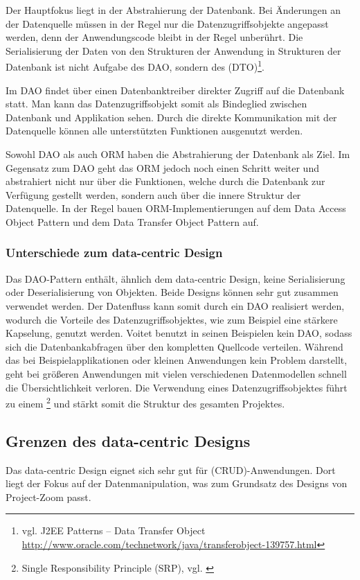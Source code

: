 Der Hauptfokus liegt in der Abstrahierung der Datenbank. Bei Änderungen an der Datenquelle müssen in der Regel nur die Datenzugriffsobjekte angepasst werden, denn der Anwendungscode bleibt in der Regel unberührt. Die Serialisierung der Daten von den Strukturen der Anwendung in Strukturen der Datenbank ist nicht Aufgabe des DAO, sondern des  (DTO)\footnote{vgl. J2EE Patterns – Data Transfer Object \url{http://www.oracle.com/technetwork/java/transferobject-139757.html}}.

Im DAO findet über einen Datenbanktreiber direkter Zugriff auf die Datenbank statt. Man kann das Datenzugriffsobjekt somit als Bindeglied zwischen Datenbank und Applikation sehen. Durch die direkte Kommunikation mit der Datenquelle können alle unterstützten Funktionen ausgenutzt werden. 

Sowohl DAO als auch ORM haben die Abstrahierung der Datenbank als Ziel. Im Gegensatz zum DAO geht das ORM jedoch noch einen Schritt weiter und abstrahiert nicht nur über die Funktionen, welche durch die Datenbank zur Verfügung gestellt werden, sondern auch über die innere Struktur der Datenquelle. In der Regel bauen ORM-Implementierungen auf dem Data Access Object Pattern und dem Data Transfer Object Pattern auf.

\subsubsection{Unterschiede zum data-centric Design}
Das DAO-Pattern enthält, ähnlich dem data-centric Design, keine Serialisierung oder Deserialisierung von Objekten. Beide Designs können sehr gut zusammen verwendet werden. Der Datenfluss kann somit durch ein DAO realisiert werden, wodurch die Vorteile des Datenzugriffsobjektes, wie zum Beispiel eine stärkere Kapselung, genutzt werden. Voitet benutzt in seinen Beispielen kein DAO, sodass sich die Datenbankabfragen über den kompletten Quellcode verteilen. Während das bei Beispielapplikationen oder kleinen Anwendungen kein Problem darstellt, geht bei größeren Anwendungen mit vielen verschiedenen Datenmodellen schnell die Übersichtlichkeit verloren. Die Verwendung eines Datenzugriffsobjektes führt zu einem \footnote{ Single Responsibility Principle (SRP), vgl. \cite[p.~339]{design-patterns}}
 und stärkt somit die Struktur des gesamten Projektes. 

\subsection{Grenzen des data-centric Designs}
Das data-centric Design eignet sich sehr gut für  (CRUD)-Anwendungen. Dort liegt der Fokus auf der Datenmanipulation, was zum Grundsatz des Designs von Project-Zoom passt.

